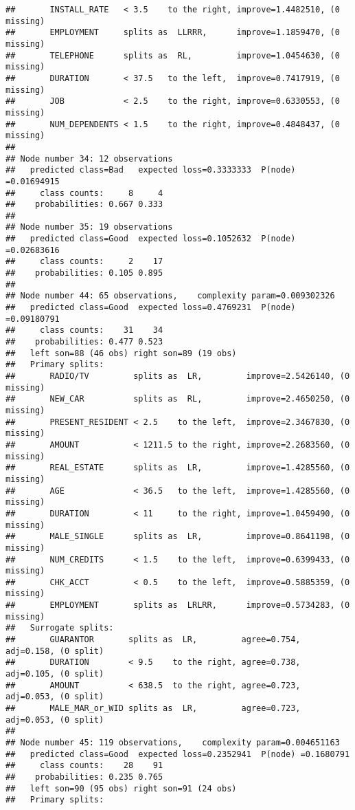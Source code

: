 \documentclass[
]{article}
\begin{document}
\begin{verbatim}
##       INSTALL_RATE   < 3.5    to the right, improve=1.4482510, (0 missing)
##       EMPLOYMENT     splits as  LLRRR,      improve=1.1859470, (0 missing)
##       TELEPHONE      splits as  RL,         improve=1.0454630, (0 missing)
##       DURATION       < 37.5   to the left,  improve=0.7417919, (0 missing)
##       JOB            < 2.5    to the right, improve=0.6330553, (0 missing)
##       NUM_DEPENDENTS < 1.5    to the right, improve=0.4848437, (0 missing)
## 
## Node number 34: 12 observations
##   predicted class=Bad   expected loss=0.3333333  P(node) =0.01694915
##     class counts:     8     4
##    probabilities: 0.667 0.333 
## 
## Node number 35: 19 observations
##   predicted class=Good  expected loss=0.1052632  P(node) =0.02683616
##     class counts:     2    17
##    probabilities: 0.105 0.895 
## 
## Node number 44: 65 observations,    complexity param=0.009302326
##   predicted class=Good  expected loss=0.4769231  P(node) =0.09180791
##     class counts:    31    34
##    probabilities: 0.477 0.523 
##   left son=88 (46 obs) right son=89 (19 obs)
##   Primary splits:
##       RADIO/TV         splits as  LR,         improve=2.5426140, (0 missing)
##       NEW_CAR          splits as  RL,         improve=2.4650250, (0 missing)
##       PRESENT_RESIDENT < 2.5    to the left,  improve=2.3467830, (0 missing)
##       AMOUNT           < 1211.5 to the right, improve=2.2683560, (0 missing)
##       REAL_ESTATE      splits as  LR,         improve=1.4285560, (0 missing)
##       AGE              < 36.5   to the left,  improve=1.4285560, (0 missing)
##       DURATION         < 11     to the right, improve=1.0459490, (0 missing)
##       MALE_SINGLE      splits as  LR,         improve=0.8641198, (0 missing)
##       NUM_CREDITS      < 1.5    to the left,  improve=0.6399433, (0 missing)
##       CHK_ACCT         < 0.5    to the left,  improve=0.5885359, (0 missing)
##       EMPLOYMENT       splits as  LRLRR,      improve=0.5734283, (0 missing)
##   Surrogate splits:
##       GUARANTOR       splits as  LR,         agree=0.754, adj=0.158, (0 split)
##       DURATION        < 9.5    to the right, agree=0.738, adj=0.105, (0 split)
##       AMOUNT          < 638.5  to the right, agree=0.723, adj=0.053, (0 split)
##       MALE_MAR_or_WID splits as  LR,         agree=0.723, adj=0.053, (0 split)
## 
## Node number 45: 119 observations,    complexity param=0.004651163
##   predicted class=Good  expected loss=0.2352941  P(node) =0.1680791
##     class counts:    28    91
##    probabilities: 0.235 0.765 
##   left son=90 (95 obs) right son=91 (24 obs)
##   Primary splits:

\end{verbatim}
\end{document}
